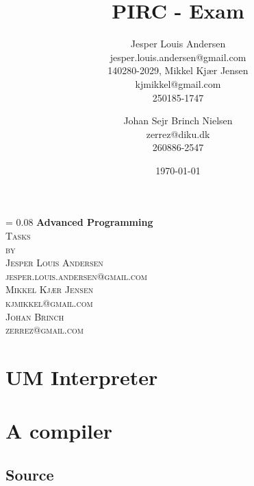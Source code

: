 \documentclass[a4paper, oneside, 10pt, draft]{memoir}
\author{Jesper Louis
  Andersen\\jesper.louis.andersen@gmail.com\\140280-2029,
  Mikkel Kj\ae r Jensen \\ kjmikkel@gmail.com\\250185-1747 \and
  Johan Sejr Brinch Nielsen \\ zerrez@diku.dk \\ 260886-2547
}
\title{PIRC - Exam}
\date{\today}
\makeatletter
\renewcommand*{\titleM}{\begingroup%
  \drop = 0.08\textheight
  \centering
  {\Huge\bfseries Advanced Programming}\\[\baselineskip]
  {\scshape Tasks}\\[\baselineskip]
  {\scshape by}\\[\baselineskip]
  {\large\scshape Jesper Louis Andersen\\jesper.louis.andersen@gmail.com}\\[\baselineskip]
  {\large\scshape Mikkel Kj\ae r Jensen\\kjmikkel@gmail.com}\\[\baselineskip]
  {\large\scshape Johan Brinch\\zerrez@gmail.com}\\[\baselineskip]
  \endgroup}
\makeatother
\begin{document}
\titleM
\listoffixmes
\tableofcontents

\chapter{UM Interpreter}
\label{chap:task+1}

\chapter{A compiler}




%



\appendix

\clearpage
\section{Source}

\clearpage

\clearpage

\clearpage

\clearpage

\end{document}
